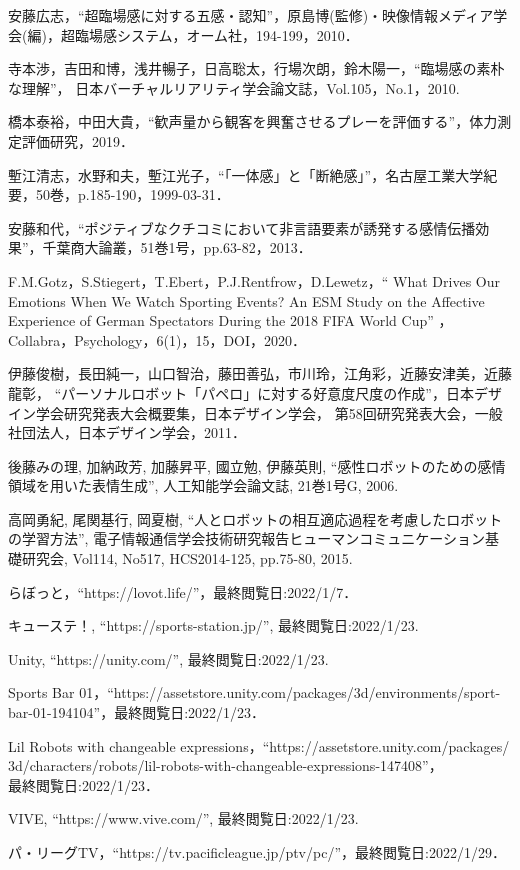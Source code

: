 \begin{thebibliography}{27}
安藤広志，``超臨場感に対する五感・認知''，原島博(監修)・映像情報メディア学会(編)，超臨場感システム，オーム社，194-199，2010．

寺本渉，吉田和博，浅井暢子，日高聡太，行場次朗，鈴木陽一，``臨場感の素朴な理解''，
日本バーチャルリアリティ学会論文誌，Vol.105，No.1，2010.

橋本泰裕，中田大貴，``歓声量から観客を興奮させるプレーを評価する''，体力測定評価研究，2019．

塹江清志，水野和夫，塹江光子，``「一体感」と「断絶感」''，名古屋工業大学紀要，50巻，p.185-190，1999-03-31．

安藤和代，``ポジティブなクチコミにおいて非言語要素が誘発する感情伝播効果''，千葉商大論叢，51巻1号，pp.63-82，2013．

F.M.Gotz，S.Stiegert，T.Ebert，P.J.Rentfrow，D.Lewetz，`` What Drives Our Emotions When We Watch Sporting Events? An ESM Study on the Affective Experience of German Spectators During the 2018 FIFA World Cup''
，Collabra，Psychology，6(1)，15，DOI，2020．

伊藤俊樹，長田純一，山口智治，藤田善弘，市川玲，江角彩，近藤安津美，近藤龍彰，
``パーソナルロボット「パペロ」に対する好意度尺度の作成''，日本デザイン学会研究発表大会概要集，日本デザイン学会，
第58回研究発表大会，一般社団法人，日本デザイン学会，2011．

後藤みの理, 加納政芳, 加藤昇平, 國立勉, 伊藤英則, ``感性ロボットのための感情領域を用いた表情生成'', 
人工知能学会論文誌, 21巻1号G, 2006.

高岡勇紀, 尾関基行, 岡夏樹, ``人とロボットの相互適応過程を考慮したロボットの学習方法'', 
電子情報通信学会技術研究報告ヒューマンコミュニケーション基礎研究会, Vol114, 
No517, HCS2014-125, pp.75-80, 2015.

らぼっと，``https://lovot.life/''，最終閲覧日:2022/1/7．


キューステ！, ``https://sports-station.jp/'', 最終閲覧日:2022/1/23.

Unity, ``https://unity.com/'', 最終閲覧日:2022/1/23.

Sports Bar 01，``https://assetstore.unity.com/packages/3d/environments/sport-bar-01-194104''，最終閲覧日:2022/1/23．

Lil Robots with changeable expressions，``https://assetstore.unity.com/packages/\\3d/characters/robots/lil-robots-with-changeable-expressions-147408''，\\最終閲覧日:2022/1/23．

VIVE, ``https://www.vive.com/'', 最終閲覧日:2022/1/23.


パ・リーグTV，``https://tv.pacificleague.jp/ptv/pc/''，最終閲覧日:2022/1/29．




\end{thebibliography}